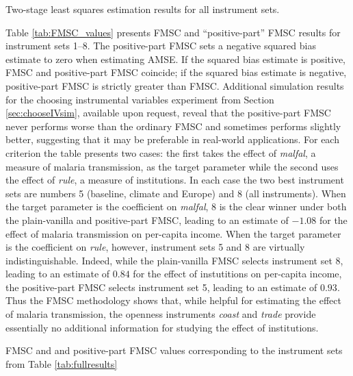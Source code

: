 \begin{table}[h]
  \small
\centering

\caption{Two-stage least squares estimation results for all instrument sets.}
\label{tab:fullresults}

\end{table}

Table \ref{tab:FMSC_values} presents FMSC and ``positive-part'' FMSC results for instrument sets 1--8.
The positive-part FMSC sets a negative squared bias estimate to zero when estimating AMSE.
If the squared bias estimate is positive, FMSC and positive-part FMSC coincide; if the squared bias estimate is negative, positive-part FMSC is strictly greater than FMSC. 
Additional simulation results for the choosing instrumental variables experiment from Section \ref{sec:chooseIVsim}, available upon request, reveal that the positive-part FMSC never performs worse than the ordinary FMSC and sometimes performs slightly better, suggesting that it may be preferable in real-world applications.
For each criterion the table presents two cases: the first takes the effect of \emph{malfal}, a measure of malaria transmission, as the target parameter while the second uses the effect of \emph{rule}, a measure of institutions. 
In each case the two best instrument sets are numbers 5 (baseline, climate and Europe) and 8 (all instruments).
When the target parameter is the coefficient on \emph{malfal}, 8 is the clear winner under both the plain-vanilla and positive-part FMSC, leading to an estimate of $-1.08$ for the effect of malaria transmission on per-capita income.
When the target parameter is the coefficient on \emph{rule}, however, instrument sets 5 and 8 are virtually indistinguishable.
Indeed, while the plain-vanilla FMSC selects instrument set 8, leading to an estimate of $0.84$ for the effect of instutitions on per-capita income, the positive-part FMSC selects instrument set 5, leading to an estimate of $0.93$. 
Thus the FMSC methodology shows that, while helpful for estimating the effect of malaria transmission, the openness instruments \emph{coast} and \emph{trade} provide essentially no additional information for studying the effect of institutions.

\begin{table}[htbp]
  \small
	\centering
	
		\caption{FMSC and and positive-part FMSC values corresponding to the instrument sets from Table \ref{tab:fullresults}}
		\label{tab:FMSC_values}
\end{table}

